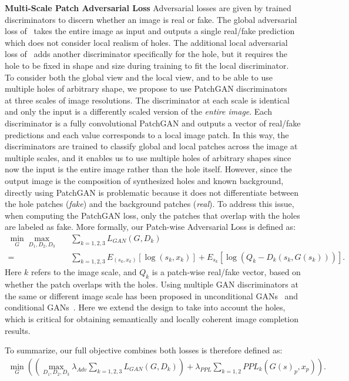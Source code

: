 \noindent\textbf{Multi-Scale Patch Adversarial Loss} Adversarial losses are given by trained discriminators to discern whether an image is real or fake. The global adversarial loss of~\cite{pathak2016context} takes the entire image as input and outputs a single real/fake prediction which does not consider local realism of holes. The additional local adversarial loss of~\cite{iizuka2017globally} adds another discriminator specifically for the hole, but it requires the hole to be fixed in shape and size during training to fit the local discriminator. To consider both the global view and the local view, and to be able to use multiple holes of arbitrary shape, we propose to use PatchGAN discriminators~\cite{isola2016image} at three scales of image resolutions. The discriminator at each scale is identical and only the input is a differently scaled version of the \textit{entire image}. Each discriminator is a fully convolutional PatchGAN and outputs a vector of real/fake predictions and each value corresponds to a local image patch. In this way, the discriminators are trained to classify global and local patches across the image at multiple scales, and it enables us to use multiple holes of arbitrary shapes since now the input is the entire image rather than the hole itself. However, since the output image is the composition of synthesized holes and known background, directly using PatchGAN is problematic because it does not differentiate between the hole patches (\textit{fake}) and the background patches (\textit{real}). To address this issue, when computing the PatchGAN loss, only the patches that overlap with the holes are labeled as fake. More formally, our Patch-wise Adversarial Loss is defined as: 
\begin{eqnarray}
\min\limits_G\max\limits_{D_1, D_2, D_3}&&\sum\limits_{k=1,2,3} L_{GAN}(G,D_k)  \\ = &&\sum\limits_{k=1,2,3}E_{(s_k,x_k)}[\log (s_k,x_k)] + E_{s_k}[\log (Q_k-D_k(s_k,G(s_k)))].
\end{eqnarray}
\label{eqn:adversarial_loss}
Here $k$ refers to the image scale, and $Q_k$ is a patch-wise real/fake vector, based on whether the patch overlaps with the holes. Using multiple GAN discriminators at the same or different image scale has been proposed in unconditional GANs~\cite{durugkar2016generative} and conditional GANs~\cite{wang2017high}. Here we extend the design to take into account the holes, which is critical for obtaining semantically and locally coherent image completion results.

To summarize, our full objective combines both losses is therefore defined as:
\begin{eqnarray}
\min\limits_G((\max\limits_{D_1, D_2, D_3}\lambda_{Adv}\sum\limits_{k=1,2,3} L_{GAN}(G,D_k))+\lambda_{PPL}\sum\limits_{k=1,2}PPL_k(G(s)_p, x_p)).
\end{eqnarray}

